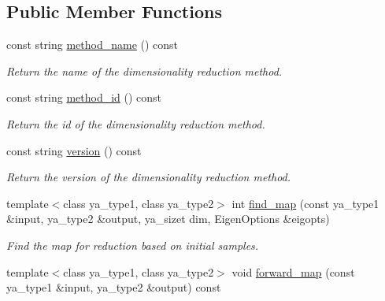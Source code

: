 \subsection*{Public Member Functions}
\begin{CompactItemize}
\item 
\hypertarget{class_y_a_p_c_a_reduce_a2}{
const string \hyperlink{class_y_a_p_c_a_reduce_a2}{method\_\-name} () const }
\label{class_y_a_p_c_a_reduce_a2}

\begin{CompactList}\small\item\em Return the name of the dimensionality reduction method. \item\end{CompactList}\item 
\hypertarget{class_y_a_p_c_a_reduce_a3}{
const string \hyperlink{class_y_a_p_c_a_reduce_a3}{method\_\-id} () const }
\label{class_y_a_p_c_a_reduce_a3}

\begin{CompactList}\small\item\em Return the id of the dimensionality reduction method. \item\end{CompactList}\item 
\hypertarget{class_y_a_p_c_a_reduce_a4}{
const string \hyperlink{class_y_a_p_c_a_reduce_a4}{version} () const }
\label{class_y_a_p_c_a_reduce_a4}

\begin{CompactList}\small\item\em Return the version of the dimensionality reduction method. \item\end{CompactList}\item 
template$<$class ya\_\-type1, class ya\_\-type2$>$ int \hyperlink{class_y_a_p_c_a_reduce_a5}{find\_\-map} (const ya\_\-type1 \&input, ya\_\-type2 \&output, ya\_\-sizet dim, Eigen\-Options \&eigopts)
\begin{CompactList}\small\item\em Find the map for reduction based on initial samples. \item\end{CompactList}\item 
\hypertarget{class_y_a_p_c_a_reduce_a6}{
template$<$class ya\_\-type1, class ya\_\-type2$>$ void \hyperlink{class_y_a_p_c_a_reduce_a6}{forward\_\-map} (const ya\_\-type1 \&input, ya\_\-type2 \&output) const }
\label{class_y_a_p_c_a_reduce_a6}


\end{CompactItemize}
